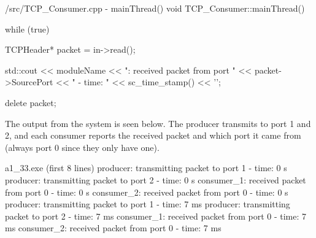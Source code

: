 \documentclass[../main.tex]{subfiles}
\begin{document}
\begin{myminted}{/src/TCP\_Consumer.cpp - mainThread()}
void TCP_Consumer::mainThread() {
    while (true) {
        TCPHeader* packet = in->read();

        std::cout << moduleName << ": received packet from port " 
        << packet->SourcePort << " - time: " 
        << sc_time_stamp() << '\n';

        delete packet;
    }
}
\end{myminted}

The output from the system is seen below. The producer transmits to port 1 and 2, and each consumer reports the received packet and which port it came from (always port 0 since they only have one).

\begin{mintedterminal}{a1\_33.exe (first 8 lines)}
producer: transmitting packet to port 1 - time: 0 s
producer: transmitting packet to port 2 - time: 0 s
consumer_1: received packet from port 0 - time: 0 s
consumer_2: received packet from port 0 - time: 0 s
producer: transmitting packet to port 1 - time: 7 ms
producer: transmitting packet to port 2 - time: 7 ms
consumer_1: received packet from port 0 - time: 7 ms
consumer_2: received packet from port 0 - time: 7 ms
\end{mintedterminal}
\end{document}
